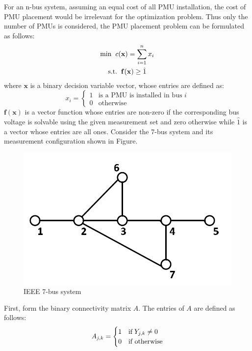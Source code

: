 \documentclass[conference]{IEEEtran}
\begin{document}
For an n-bus system, assuming an equal cost of all PMU installation, the cost of PMU placement would be irrelevant for the optimization problem. Thus only the number of PMUs is considered, the PMU placement problem can be formulated as follows:
\begin{gather}
	\text{min}\hspace{2mm}c(\mathbf{x})=\sum_{i=1}^{n}x_i \\
	\text{s.t.}\hspace{2mm}\mathbf{f}(\mathbf{x}) \geq \hat{1}
\end{gather}
where $\mathbf{x}$ is a binary decision variable vector, whose entries are defined as:
\begin{equation}
	x_i=\begin{cases}
		1 & \text{is a PMU is installed in bus $i$} \\
		0 & \text{otherwise}
		\label{eq:x}
	\end{cases}
\end{equation}
$\mathbf{f}(\mathbf{x})$ is a vector function whose entries are non-zero if the corresponding bus voltage is solvable using the given measurement set and zero otherwise while $\hat{1}$ is a vector whose entries are all ones. Consider the 7-bus system and its measurement configuration shown in Figure.
\begin{figure}[htbp]
	\includegraphics[width=\columnwidth]{fig2.1.png}
	\caption{IEEE 7-bus system}
	\label{fig:ieee7}
\end{figure}
First, form the binary connectivity matrix $A$. The entries of $A$ are defined as follows:
\begin{equation}
	A_{j,k} = \begin{cases}
		1 &\text{if}\hspace{1mm}Y_{j,k} \neq 0 \\
		0 &\text{if otherwise}
	\end{cases}
\end{equation}
\end{document}
